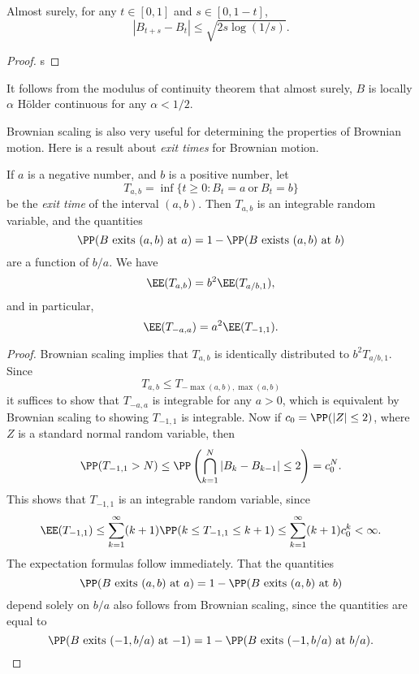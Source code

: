 \begin{theorem}
    Almost surely, for any $t \in [0,1]$ and $s \in [0,1-t]$,
    \[ |B_{t + s} - B_t| \leq \sqrt{2s \log(1/s)}. \]
\end{theorem}
\begin{proof}
    s
\end{proof}

\begin{remark}
    It follows from the modulus of continuity theorem that almost surely, $B$ is locally $\alpha$ H\"{o}lder continuous for any $\alpha < 1/2$.
\end{remark}

Brownian scaling is also very useful for determining the properties of Brownian motion. Here is a result about \emph{exit times} for Brownian motion.

\begin{lemma}
    If $a$ is a negative number, and $b$ is a positive number, let
    \[ T_{a,b} = \inf \{ t \geq 0 : B_t = a\ \text{or}\ B_t = b \} \]
    be the \emph{exit time} of the interval $(a,b)$. Then $T_{a,b}$ is an integrable random variable, and the quantities
    \[ \PP( B\ \text{exits $(a,b)$ at $a$} ) = 1 - \PP( B\ \text{exists $(a,b)$ at $b$}) \]
    are a function of $b/a$. We have
    \[ \EE(T_{a,b}) = b^2 \EE(T_{a/b,1}), \]
    and in particular,
    \[ \EE(T_{-a,a}) = a^2 \EE(T_{-1,1}). \]
\end{lemma}
\begin{proof}
    Brownian scaling implies that $T_{a,b}$ is identically distributed to $b^2 T_{a/b,1}$. Since
    \[ T_{a,b} \leq T_{-\max(a,b), \max(a,b)} \]
    it suffices to show that $T_{-a,a}$ is integrable for any $a > 0$, which is equivalent by Brownian scaling to showing $T_{-1,1}$ is integrable. Now if $c_0 = \PP(|Z| \leq 2)$, where $Z$ is a standard normal random variable, then
    \[ \PP(T_{-1,1} > N) \leq \PP \left( \bigcap_{k = 1}^N |B_k - B_{k-1}| \leq 2 \right) = c_0^N. \]
    This shows that $T_{-1,1}$ is an integrable random variable, since
    \[ \EE(T_{-1,1}) \leq \sum_{k = 1}^\infty (k+1) \PP(k \leq T_{-1,1} \leq k+1) \leq \sum_{k = 1}^\infty (k+1) c_0^k < \infty. \]
    The expectation formulas follow immediately. That the quantities
    \[ \PP( B\ \text{exits $(a,b)$ at $a$} ) = 1 - \PP( B\ \text{exits $(a,b)$ at $b$}) \]
    depend solely on $b/a$ also follows from Brownian scaling, since the quantities are equal to
    \[ \PP( B\ \text{exits $(-1,b/a)$ at $-1$} ) = 1 - \PP( B\ \text{exits $(-1,b/a)$ at $b/a$}). \qedhere \]
\end{proof}

